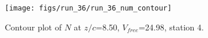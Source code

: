 \begin{figure}[H]
\centering
\texttt{[image: figs/run\_36/run\_36\_num\_contour]}
\caption{Contour plot of $N$ at $z/c$=8.50, $V_{free}$=24.98, station 4.}
\label{fig:run_36_num_contour}
\end{figure}



